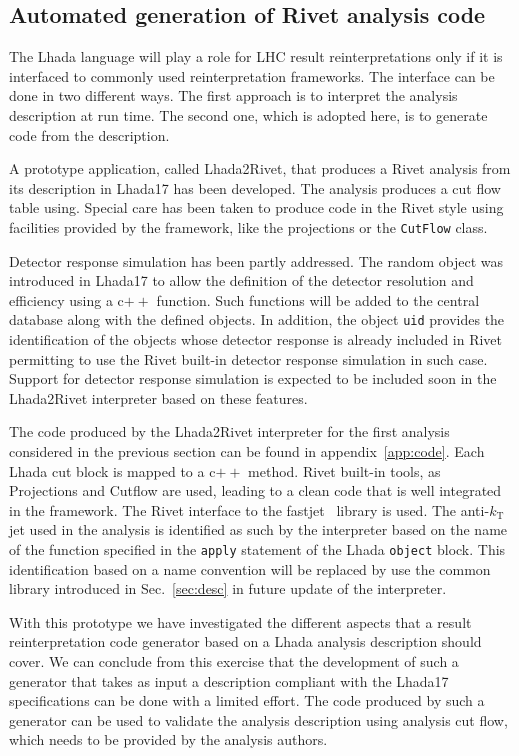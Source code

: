 \documentclass[11pt]{cernrep}
\begin{document}
\subsection{Automated generation of Rivet analysis code}

The {\sc Lhada} language will play a role for LHC result reinterpretations only if it is interfaced to commonly used reinterpretation frameworks. The interface can be done in two different ways. The first approach is to interpret the analysis description at run time. The second one, which is adopted here, is to generate code from the description.

A prototype application, called {\sc Lhada2Rivet}, that produces a Rivet analysis from its description in {\sc Lhada17} has been developed. The analysis produces a cut flow table using. Special care has been taken to produce code in the {\sc Rivet} style using facilities provided by the framework, like the projections or the {\tt CutFlow} class.

Detector response simulation has been partly addressed. The random object was introduced in {\sc Lhada17} to allow the definition of  the detector resolution and efficiency using a c$++$ function.  Such functions will be added to the central database along with the defined objects. In addition, the object {\tt uid} provides the identification of the objects whose detector response is already included in {\sc Rivet} permitting to use the {\sc Rivet} built-in detector response simulation in such case. Support for detector response simulation is expected to be included soon in the {\sc Lhada2Rivet} interpreter based on these features.

The code produced by the {\sc Lhada2Rivet} interpreter for the first analysis considered in the previous section can be found in appendix~\ref{app:code}. Each {\sc Lhada} cut block is mapped to a c$++$ method. {\sc Rivet} built-in tools, as Projections and Cutflow are used, leading to a clean code that is well integrated in the framework. The {\sc Rivet} interface to the fastjet~\cite{Cacciari:2011ma} library is used. The anti-$k_{\text{T}}$ jet used in the analysis is identified as such by the interpreter based on the name of the function specified in the {\tt apply} statement of the {\sc Lhada} {\tt object} block. This identification based on a name convention will be replaced by use the common library introduced in Sec.~\ref{sec:desc} in future update of the interpreter.

With this prototype we have investigated the different aspects that a result reinterpretation code generator based on a {\sc Lhada} analysis description should cover. We can conclude from this exercise that the development of such a generator that takes as input a description compliant with the {\sc Lhada17} specifications can be done with a limited effort. The code produced by such a generator can be used to validate the analysis description using analysis cut flow, which needs to be provided by the analysis authors. 
\end{document}
